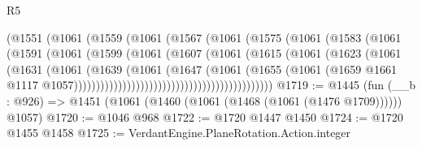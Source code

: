 \begin{lexlean}{R5}
\begin{coremodule}
                                    (@1551
                                      (@1061
                                        (@1559
                                          (@1061
                                            (@1567
                                              (@1061
                                                (@1575
                                                  (@1061
                                                    (@1583
                                                      (@1061
                                                        (@1591
                                                          (@1061
                                                            (@1599
                                                              (@1061
                                                                (@1607
                                                                  (@1061
                                                                    (@1615
                                                                      (@1061
                                                                        (@1623
                                                                          (@1061
                                                                            (@1631
                                                                              (@1061
                                                                                (@1639
                                                                                  (@1061
                                                                                    (@1647
                                                                                      (@1061
                                                                                        (@1655
                                                                                          (@1061
                                                                                            (@1659
                                                                                              @1661
                                                                                              @1117
                                                                                              @1057)))))))))))))))))))))))))))))))))))))))))))))
@1719 := @1445
    (fun (__b : @926) => @1451 (@1061 (@1460 (@1061 (@1468 (@1061 (@1476 @1709)))))) @1057)
@1720 := @1046 @968
@1722 := @1720 @1447 @1450
@1724 := @1720 @1455 @1458
@1725 := VerdantEngine.PlaneRotation.Action.integer

\end{coremodule}
\end{lexlean}
